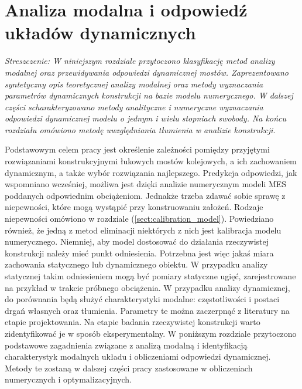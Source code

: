 \chapter{Analiza modalna i odpowiedź układów dynamicznych} \label{sect:modal_analysis_and_response}

\textit{Streszczenie: W niniejszym rozdziale przytoczono klasyfikację metod analizy modalnej oraz przewidywania odpowiedzi dynamicznej mostów. Zaprezentowano syntetyczny opis teoretycznej analizy modalnej oraz metody wyznaczania parametrów dynamicznych konstrukcji na bazie modelu numerycznego. W dalszej części scharakteryzowano metody analityczne i numeryczne wyznaczania odpowiedzi dynamicznej modelu o jednym i wielu stopniach swobody. Na końcu rozdziału omówiono metodę uwzględniania tłumienia w analizie konstrukcji.}

\vspace{1cm}


Podstawowym celem pracy jest określenie zależności pomiędzy przyjętymi rozwiązaniami konstrukcyjnymi łukowych mostów kolejowych, a ich zachowaniem dynamicznym, a także wybór rozwiązania najlepszego. Predykcja odpowiedzi, jak wspomniano wcześniej, możliwa jest dzięki analizie numerycznym modeli MES poddanych odpowiednim obciążeniom. Jednakże trzeba zdawać sobie sprawę z niepewności, które mogą wystąpić przy konstruowaniu założeń. Rodzaje niepewności omówiono w rozdziale (\ref{sect:calibration_model}). Powiedziano również, że jedną z metod eliminacji niektórych z nich jest kalibracja modelu numerycznego. Niemniej, aby model dostosować do działania rzeczywistej konstrukcji należy mieć punkt odniesienia. Potrzebna jest więc jakaś miara zachowania statycznego lub dynamicznego obiektu. W przypadku analizy statycznej takim odniesieniem mogą być pomiary statyczne ugięć, zarejestrowane na przykład w trakcie próbnego obciążenia. W przypadku analizy dynamicznej, do porównania będą służyć charakterystyki modalne: częstotliwości i postaci drgań własnych oraz tłumienia. Parametry te można zaczerpnąć z literatury na etapie projektowania. Na etapie badania rzeczywistej konstrukcji warto zidentyfikować je w sposób eksperymentalny. W poniższym rozdziale przytoczono podstawowe zagadnienia związane z analizą modalną i identyfikacją charakterystyk modalnych układu i  obliczeniami odpowiedzi dynamicznej. Metody te zostaną w dalszej części pracy zastosowane w obliczeniach numerycznych i optymalizacyjnych.

